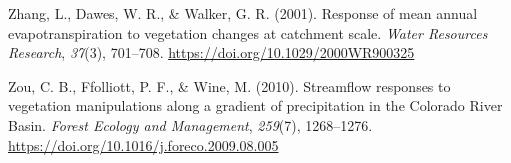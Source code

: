 \documentclass[
]{agujournal2019}
\newlength{\cslhangindent}
\newenvironment{CSLReferences}[2] %
 {\begin{list}{}{%
  \setlength{\itemindent}{0pt}
  \setlength{\leftmargin}{0pt}
  \setlength{\parsep}{0pt}
  \ifodd #1
   \setlength{\leftmargin}{\cslhangindent}
   \setlength{\itemindent}{-1\cslhangindent}
  \fi
  \setlength{\itemsep}{#2\baselineskip}}}
 {\end{list}}
\begin{document}
\begin{CSLReferences}{1}{0}
Zhang, L., Dawes, W. R., \& Walker, G. R. (2001). Response of mean
annual evapotranspiration to vegetation changes at catchment scale.
\emph{Water Resources Research}, \emph{37}(3), 701--708.
\url{https://doi.org/10.1029/2000WR900325}

Zou, C. B., Ffolliott, P. F., \& Wine, M. (2010). Streamflow responses
to vegetation manipulations along a gradient of precipitation in the
{Colorado} {River} {Basin}. \emph{Forest Ecology and Management},
\emph{259}(7), 1268--1276.
\url{https://doi.org/10.1016/j.foreco.2009.08.005}

\end{CSLReferences}
\end{document}
